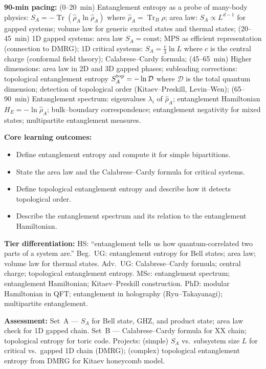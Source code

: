 \documentclass[11pt,a4paper]{article}
\begin{document}
\medskip

\begin{tcolorbox}[modulebox, title={Module~II.7 / L11: Entanglement in Many-Body Systems}]
\textbf{90-min pacing:} (0--20~min) Entanglement entropy as a probe of many-body physics: $S_A=-\operatorname{Tr}(\hat\rho_A\ln\hat\rho_A)$ where $\hat\rho_A=\operatorname{Tr}_B\hat\rho$; area law: $S_A\propto L^{d-1}$ for gapped systems; volume law for generic excited states and thermal states; (20--45~min) 1D gapped systems: area law $S_A=\mathrm{const}$; MPS as efficient representation (connection to DMRG); 1D critical systems: $S_A=\tfrac{c}{3}\ln L$ where $c$ is the central charge (conformal field theory); Calabrese--Cardy formula; (45--65~min) Higher dimensions: area law in 2D and 3D gapped phases; subleading corrections: topological entanglement entropy $S_A^{\rm top}=-\ln\mathcal{D}$ where $\mathcal{D}$ is the total quantum dimension; detection of topological order (Kitaev--Preskill, Levin--Wen); (65--90~min) Entanglement spectrum: eigenvalues $\lambda_i$ of $\hat\rho_A$; entanglement Hamiltonian $H_E=-\ln\hat\rho_A$; bulk--boundary correspondence; entanglement negativity for mixed states; multipartite entanglement measures.

\medskip\textbf{Core learning outcomes:}
\begin{itemize}[leftmargin=1.4em,topsep=2pt,itemsep=1pt]
  \item Define entanglement entropy and compute it for simple bipartitions.
  \item State the area law and the Calabrese--Cardy formula for critical systems.
  \item Define topological entanglement entropy and describe how it detects topological order.
  \item Describe the entanglement spectrum and its relation to the entanglement Hamiltonian.
\end{itemize}

\medskip\textbf{Tier differentiation:}
HS: ``entanglement tells us how quantum-correlated two parts of a system are.''
Beg.\ UG: entanglement entropy for Bell states; area law; volume law for thermal states.
Adv.\ UG: Calabrese--Cardy formula; central charge; topological entanglement entropy.
MSc: entanglement spectrum; entanglement Hamiltonian; Kitaev--Preskill construction.
PhD: modular Hamiltonian in QFT; entanglement in holography (Ryu--Takayanagi); multipartite entanglement.

\medskip\textbf{Assessment:}
Set~A --- $S_A$ for Bell state, GHZ, and product state; area law check for 1D gapped chain.
Set~B --- Calabrese--Cardy formula for XX chain; topological entropy for toric code.
Projects: (simple) $S_A$ vs.\ subsystem size $L$ for critical vs.\ gapped 1D chain (DMRG);
(complex) topological entanglement entropy from DMRG for Kitaev honeycomb model.
\end{tcolorbox}
\end{document}

